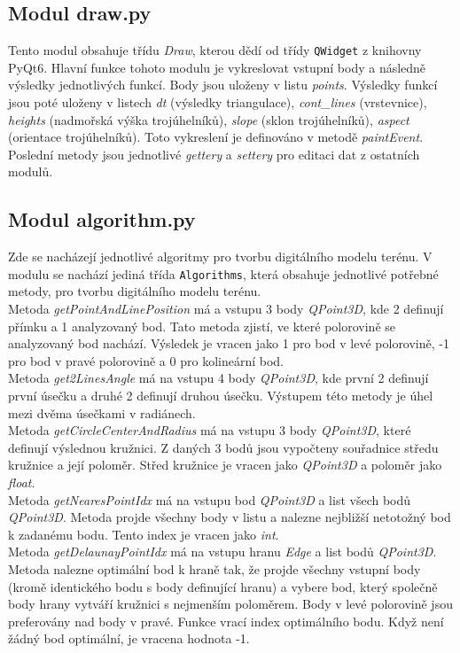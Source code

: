\documentclass{article}
\begin{document}
\subsection{\small{Modul draw.py}}
Tento modul obsahuje třídu \emph{Draw}, kterou dědí od třídy \texttt{QWidget} z knihovny PyQt6. Hlavní funkce tohoto modulu je vykreslovat vstupní body a následně výsledky jednotlivých funkcí. Body jsou uloženy v listu \emph{points}. Výsledky funkcí jsou poté uloženy v listech \emph{dt} (výsledky triangulace), \emph{cont\_lines} (vrstevnice), \emph{heights} (nadmořská výška trojúhelníků), \emph{slope} (sklon trojúhelníků), \emph{aspect} (orientace trojúhelníků). Toto vykreslení je definováno v metodě \emph{paintEvent}.\\
Poslední metody jsou jednotlivé \emph{gettery} a \emph{settery} pro editaci dat z ostatních modulů.
\subsection{\small{Modul algorithm.py}}
Zde se nacházejí jednotlivé algoritmy pro tvorbu digitálního modelu terénu. V modulu se nachází jediná třída \texttt{Algorithms}, která obsahuje jednotlivé potřebné metody, pro tvorbu digitálního modelu terénu.\\
Metoda \emph{getPointAndLinePosition} má a vstupu 3 body \emph{QPoint3D}, kde 2 definují přímku a 1 analyzovaný bod. Tato metoda zjistí, ve které polorovině se analyzovaný bod nachází. Výsledek je vracen jako 1 pro bod v levé polorovině, -1 pro bod v pravé polorovině a 0 pro kolineární bod.\\
Metoda \emph{get2LinesAngle} má na vstupu 4 body \emph{QPoint3D}, kde první 2 definují první úsečku a druhé 2 definují druhou úsečku. Výstupem této metody je úhel mezi dvěma úsečkami v radiánech.\\
Metoda \emph{getCircleCenterAndRadius} má na vstupu 3 body \emph{QPoint3D}, které definují výslednou kružnici. Z daných 3 bodů jsou vypočteny souřadnice středu kružnice a její poloměr. Střed kružnice je vracen jako \emph{QPoint3D} a poloměr jako \emph{float}.\\
Metoda \emph{getNearesPointIdx} má na vstupu bod \emph{QPoint3D} a list všech bodů \emph{QPoint3D}. Metoda projde všechny body v listu a nalezne nejbližší netotožný bod k zadanému bodu. Tento index je vracen jako \emph{int}.\\
Metoda \emph{getDelaunayPointIdx} má na vstupu hranu \emph{Edge} a list bodů \emph{QPoint3D}. Metoda nalezne optimální bod k hraně tak, že projde všechny vstupní body (kromě identického bodu s body definující hranu) a vybere bod, který společně body hrany vytváří kružnici s nejmenším poloměrem. Body v levé polorovině jsou preferovány nad body v pravé. Funkce vrací index optimálního bodu. Když není žádný bod optimální, je vracena hodnota -1.\\
\end{document}
